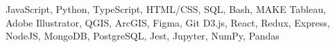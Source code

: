	\begin{cvskills}
			{JavaScript, Python, TypeScript, HTML/CSS, SQL, Bash, MAKE}
			{Tableau, Adobe Illustrator, QGIS, ArcGIS, Figma, Git}
			{D3.js, React, Redux, Express, NodeJS, MongoDB, PostgreSQL, Jest, Jupyter, NumPy, Pandas}
	\end{cvskills}
